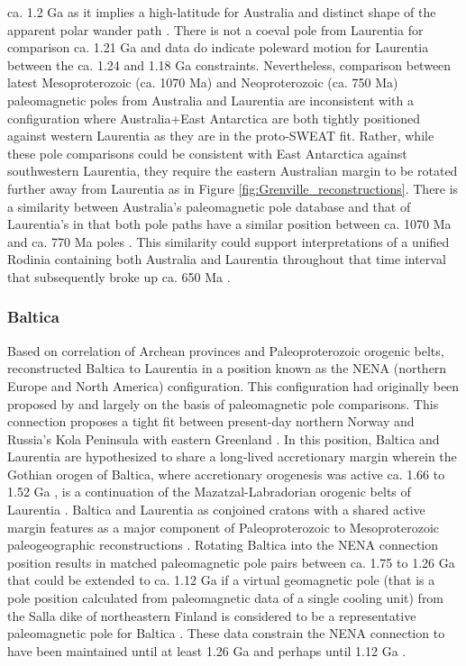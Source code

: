 \documentclass[twocolumn, switch]{article} %
\begin{document}
ca. 1.2 Ga as it implies a high-latitude for Australia and distinct shape of the apparent polar wander path \citep{Pisarevsky2014a}. There is not a coeval pole from Laurentia for comparison ca. 1.21 Ga and data do indicate poleward motion for Laurentia between the ca. 1.24 and 1.18 Ga constraints. Nevertheless, comparison between latest Mesoproterozoic (ca. 1070 Ma) and Neoproterozoic (ca. 750 Ma) paleomagnetic poles from Australia and Laurentia are inconsistent with a configuration where Australia+East Antarctica are both tightly positioned against western Laurentia as they are in the proto-SWEAT fit. Rather, while these pole comparisons could be consistent with East Antarctica against southwestern Laurentia, they require the eastern Australian margin to be rotated further away from Laurentia as in Figure \ref{fig:Grenville_reconstructions}. There is a similarity between Australia's paleomagnetic pole database and that of Laurentia's in that both pole paths have a similar position between ca. 1070 Ma and ca. 770 Ma poles \citep{Swanson-Hysell2012a}. This similarity could support interpretations of a unified Rodinia containing both Australia and Laurentia throughout that time interval \citep{Swanson-Hysell2012a} that subsequently broke up ca. 650 Ma \citep{Li2011a}.

\subsubsection{Baltica}

Based on correlation of Archean provinces and Paleoproterozoic orogenic belts, \cite{Gower1990a} reconstructed Baltica to Laurentia in a position known as the NENA (northern Europe and North America) configuration. This configuration had originally been proposed by \citet{Patchett1978a} and \citet{Piper1980a} largely on the basis of paleomagnetic pole comparisons. This connection proposes a tight fit between present-day northern Norway and Russia's Kola Peninsula with eastern Greenland \citep{Gower1990a, Salminen2021b}. In this position, Baltica and Laurentia are hypothesized to share a long-lived accretionary margin wherein the Gothian orogen of Baltica, where accretionary orogenesis was active ca. 1.66 to 1.52 Ga \citep{Bergstrom2020a}, is a continuation of the Mazatzal-Labradorian orogenic belts of Laurentia \citep{Karlstrom2001a}. Baltica and Laurentia as conjoined cratons with a shared active margin features as a major component of Paleoproterozoic to Mesoproterozoic paleogeographic reconstructions \citep{Evans2011a, Zhang2012a, Elming2021a}. Rotating Baltica into the NENA connection position results in matched paleomagnetic pole pairs between ca. 1.75 to 1.26 Ga \citep{Buchan2000a, Evans2008a} that could be extended to ca. 1.12 Ga if a virtual geomagnetic pole (that is a pole position calculated from paleomagnetic data of a single cooling unit) from the Salla dike of northeastern Finland is considered to be a representative paleomagnetic pole for Baltica \citep{Salminen2009b}. These data constrain the NENA connection to have been maintained until at least 1.26 Ga and perhaps until 1.12 Ga \citep{Salminen2021b}. 
\end{document}
